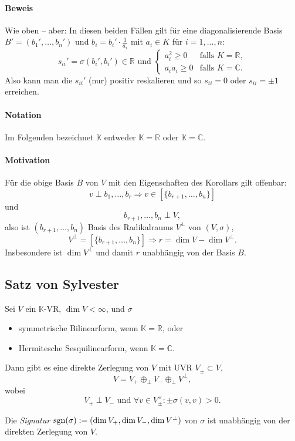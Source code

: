 \paragraph{Beweis}
	Wie oben -- aber:
	In diesen beiden Fällen gilt für eine diagonalisierende Basis $ B'=(b_1',\dots,b_n') $ und $ b_i = b_i'\cdot \frac{1}{a_i} $ mit $ a_i\in K $ für $ i=1,\dots,n $:
		\[ s_{ii}' = \sigma(b_i',b_i')\in \mathbb{R} \text{ und }
		\begin{cases}
			a_i^2 \geq 0 & \text{falls } K = \mathbb{R},\\
			\overline{a_i}a_i \geq 0 & \text{falls } K =\mathbb{C}.
		\end{cases} \]
	Also kann man die $ s_{ii}' $ (nur) positiv reskalieren und so $ s_{ii} = 0 $ oder $ s_{ii} = \pm 1 $ erreichen.
\paragraph{Notation}
	Im Folgenden bezeichnet $ \mathbb{K} $ entweder $ \mathbb{K} = \mathbb{R} $ oder $ \mathbb{K}=\mathbb{C} $.
\paragraph{Motivation}
	Für die obige Basis $ B $ von $ V $ mit den Eigenschaften des Korollars gilt offenbar:
		\[ v\perp b_1,\dots,b_r \Rightarrow v\in [\{b_{r+1},\dots,b_{n}\}] \]
	und
		\[ b_{r+1},\dots,b_n \perp V, \]
	also ist $ (b_{r+1},\dots,b_n) $ Basis des Radikalraums $ V^\perp $ von $ (V,\sigma) $,
		\[ V^\perp = [\{b_{r+1},\dots,b_n\} ] \Rightarrow r = \dim V-\dim V^\perp. \]
	Insbesondere ist $ \dim V^\perp $ und damit $ r $ unabhängig von der Basis $ B $.

\subsection{Satz von Sylvester}
\begin{Satz}	
	Sei $ V $ ein $ \mathbb{K} $-VR, $ \dim V <\infty $, und $ \sigma $
		\begin{itemize}
			\item symmetrische Bilinearform, wenn $ \mathbb{K}=\mathbb{R} $, oder
			\item Hermitesche Sesquilinearform, wenn $ \mathbb{K}=\mathbb{C} $.
		\end{itemize}
	Dann gibt es eine direkte Zerlegung von $ V $ mit UVR $ V_{\pm}\subset V $,
		\[ V= V_+ \oplus_\perp V_- \oplus_\perp V^\perp,  \]
	wobei
		\[ V_+ \perp V_- \text{ und } \forall v\in V^\times_\pm: \pm \sigma(v,v) > 0. \]
\end{Satz}
\begin{Definition}[Signatur]
	Die \emph{Signatur} $ \operatorname{sgn}(\sigma):= (\dim V_+,\dim V_-,\dim V^\perp) $ von $ \sigma $ ist unabhängig von der direkten Zerlegung von $ V $.
\end{Definition}
